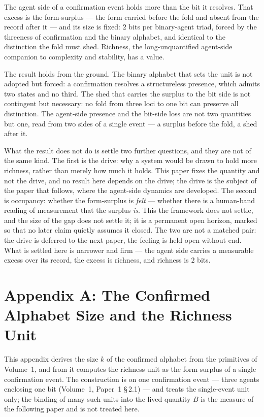 \documentclass[11pt,oneside]{report}
\theoremstyle{definition}
\theoremstyle{remark}
\begin{document}
The agent side of a confirmation event holds more than the bit it resolves. That excess is the
form-surplus --- the form carried before the fold and absent from the record after it --- and
its size is fixed: \ensuremath{2} bits per binary-agent triad, forced by the threeness of
confirmation and the binary alphabet, and identical to the distinction the fold must shed.
Richness, the long-unquantified agent-side companion to complexity and stability, has a value.

The result holds from the ground. The binary alphabet that sets the unit is not adopted but
forced: a confirmation resolves a structureless presence, which admits two states and no third.
The shed that carries the surplus to the bit side is not contingent but necessary: no fold from
three loci to one bit can preserve all distinction. The agent-side presence and the bit-side
loss are not two quantities but one, read from two sides of a single event --- a surplus before
the fold, a shed after it.

What the result does not do is settle two further questions, and they are not of the same kind.
The first is the drive: why a system would be drawn to hold more richness, rather than merely how
much it holds. This paper fixes the quantity and not the drive, and no result here depends on the
drive; the drive is the subject of the paper that follows, where the agent-side dynamics are
developed. The second is occupancy: whether the form-surplus is \emph{felt} --- whether there is a
human-band reading of measurement that the surplus \emph{is}. This the framework does not settle,
and the size of the gap does not settle it; it is a permanent open horizon, marked so that no later
claim quietly assumes it closed. The two are not a matched pair: the drive is deferred to the next
paper, the feeling is held open without end. What is settled here is narrower and firm --- the agent
side carries a measurable excess over its record, the excess is richness, and richness is
\ensuremath{2} bits.
\section*{Appendix A: The Confirmed Alphabet Size and the Richness Unit}

This appendix derives the size \ensuremath{k} of the confirmed alphabet from the
primitives of Volume~1, and from it computes the richness unit as the form-surplus
of a single confirmation event. The construction is on one confirmation event ---
three agents enclosing one bit (Volume~1, Paper~1 \S\,2.1) --- and treats the
single-event unit only; the binding of many such units into the lived quantity
\ensuremath{B} is the measure of the following paper and is not treated here.
\end{document}
